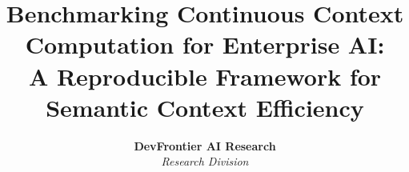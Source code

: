 \documentclass[10pt,twocolumn,letterpaper]{article}
\title{\Large\bf Benchmarking Continuous Context Computation for Enterprise AI:\\A Reproducible Framework for Semantic Context Efficiency}
\author{\textbf{DevFrontier AI Research} \\ \textit{Research Division}}
\begin{document}
\maketitle














\nocite{*}


\end{document}
